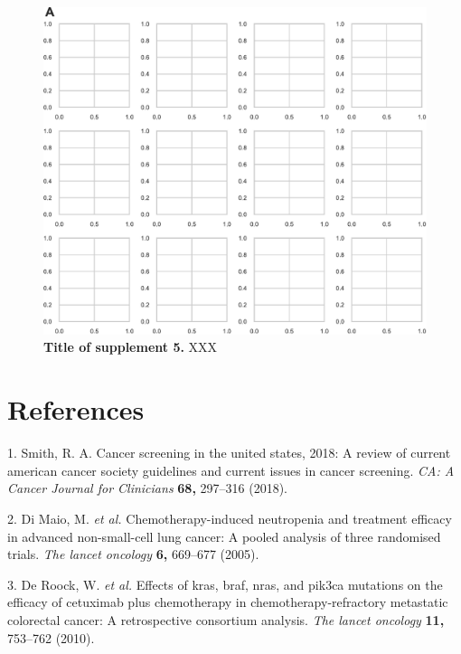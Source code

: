 \documentclass[11pt]{article}
\begin{document}
\begin{figure}
\hypertarget{fig:supp5}{%
\centering
\includegraphics{./figures/figureS5.pdf}
\caption{\textbf{Title of supplement 5.} XXX}\label{fig:supp5}
}
\end{figure}

\cleardoublepage

\hypertarget{references}{%
\section*{References}\label{references}}

\hypertarget{refs}{}
\leavevmode\hypertarget{ref-SmithCancerScreening}{}%
1. Smith, R. A. Cancer screening in the united states, 2018: A review of
current american cancer society guidelines and current issues in cancer
screening. \emph{CA: A Cancer Journal for Clinicians} \textbf{68,}
297--316 (2018).

\leavevmode\hypertarget{ref-LungHeterogeneity}{}%
2. Di Maio, M. \emph{et al.} Chemotherapy-induced neutropenia and
treatment efficacy in advanced non-small-cell lung cancer: A pooled
analysis of three randomised trials. \emph{The lancet oncology}
\textbf{6,} 669--677 (2005).

\leavevmode\hypertarget{ref-ColorectalHeterogeneity}{}%
3. De Roock, W. \emph{et al.} Effects of kras, braf, nras, and pik3ca
mutations on the efficacy of cetuximab plus chemotherapy in
chemotherapy-refractory metastatic colorectal cancer: A retrospective
consortium analysis. \emph{The lancet oncology} \textbf{11,} 753--762
(2010).
\end{document}
